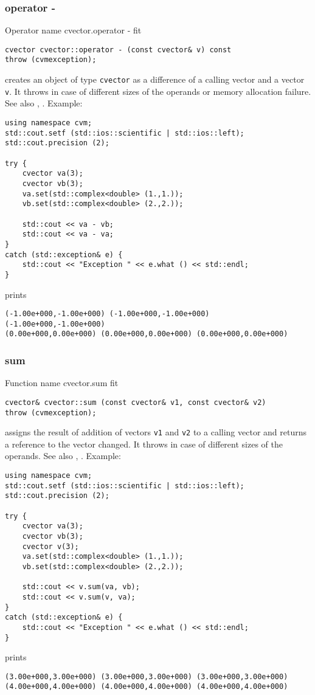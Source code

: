 \subsubsection{operator -}
Operator%
\pdfdest name {cvector.operator -} fit
\begin{verbatim}
cvector cvector::operator - (const cvector& v) const
throw (cvmexception);
\end{verbatim}
creates an object of type \verb"cvector" as a difference of
a calling  vector and a vector \verb"v".
It throws  
in case of different sizes of the operands
or memory allocation failure.
See also , .
Example:
\begin{Verbatim}
using namespace cvm;
std::cout.setf (std::ios::scientific | std::ios::left);
std::cout.precision (2);

try {
    cvector va(3);
    cvector vb(3);
    va.set(std::complex<double> (1.,1.));
    vb.set(std::complex<double> (2.,2.));

    std::cout << va - vb;
    std::cout << va - va;
}
catch (std::exception& e) {
    std::cout << "Exception " << e.what () << std::endl;
}
\end{Verbatim}
prints
\begin{Verbatim}
(-1.00e+000,-1.00e+000) (-1.00e+000,-1.00e+000) (-1.00e+000,-1.00e+000)
(0.00e+000,0.00e+000) (0.00e+000,0.00e+000) (0.00e+000,0.00e+000)
\end{Verbatim}
\newpage


\subsubsection{sum}
Function%
\pdfdest name {cvector.sum} fit
\begin{verbatim}
cvector& cvector::sum (const cvector& v1, const cvector& v2)
throw (cvmexception);
\end{verbatim}
assigns the result of addition of
vectors \verb"v1" and \verb"v2"  to a calling vector
and returns a reference to
the vector changed.
It throws  
in case of different sizes of the operands.
See also ,
.
Example:
\begin{Verbatim}
using namespace cvm;
std::cout.setf (std::ios::scientific | std::ios::left);
std::cout.precision (2);

try {
    cvector va(3);
    cvector vb(3);
    cvector v(3);
    va.set(std::complex<double> (1.,1.));
    vb.set(std::complex<double> (2.,2.));

    std::cout << v.sum(va, vb);
    std::cout << v.sum(v, va);
}
catch (std::exception& e) {
    std::cout << "Exception " << e.what () << std::endl;
}
\end{Verbatim}
prints
\begin{Verbatim}
(3.00e+000,3.00e+000) (3.00e+000,3.00e+000) (3.00e+000,3.00e+000)
(4.00e+000,4.00e+000) (4.00e+000,4.00e+000) (4.00e+000,4.00e+000)
\end{Verbatim}
\newpage


